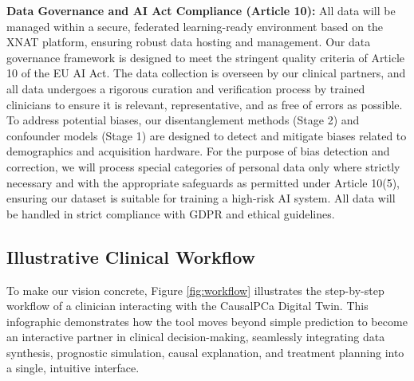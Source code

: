 \documentclass[11pt, a4paper]{article}
\begin{document}
\textbf{Data Governance and AI Act Compliance (Article 10):} All data will be managed within a secure, federated learning-ready environment based on the XNAT platform, ensuring robust data hosting and management. Our data governance framework is designed to meet the stringent quality criteria of Article 10 of the EU AI Act. The data collection is overseen by our clinical partners, and all data undergoes a rigorous curation and verification process by trained clinicians to ensure it is relevant, representative, and as free of errors as possible. To address potential biases, our disentanglement methods (Stage 2) and confounder models (Stage 1) are designed to detect and mitigate biases related to demographics and acquisition hardware. For the purpose of bias detection and correction, we will process special categories of personal data only where strictly necessary and with the appropriate safeguards as permitted under Article 10(5), ensuring our dataset is suitable for training a high-risk AI system. All data will be handled in strict compliance with GDPR and ethical guidelines.

\subsection{Illustrative Clinical Workflow}
To make our vision concrete, Figure \ref{fig:workflow} illustrates the step-by-step workflow of a clinician interacting with the CausalPCa Digital Twin. This infographic demonstrates how the tool moves beyond simple prediction to become an interactive partner in clinical decision-making, seamlessly integrating data synthesis, prognostic simulation, causal explanation, and treatment planning into a single, intuitive interface.
\end{document}
